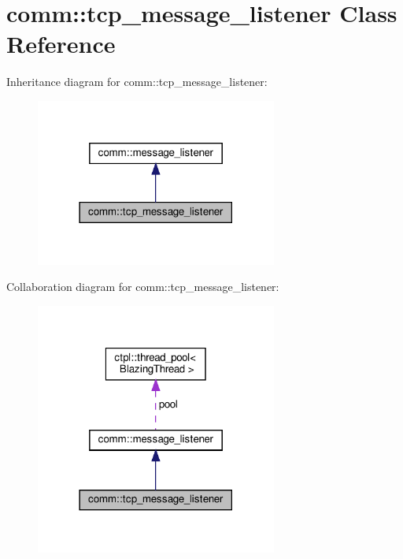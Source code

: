 \hypertarget{classcomm_1_1tcp__message__listener}{}\section{comm\+:\+:tcp\+\_\+message\+\_\+listener Class Reference}
\label{classcomm_1_1tcp__message__listener}


Inheritance diagram for comm\+:\+:tcp\+\_\+message\+\_\+listener\+:\nopagebreak
\begin{figure}[H]
\begin{center}
\leavevmode
\includegraphics[width=225pt]{classcomm_1_1tcp__message__listener__inherit__graph}
\end{center}
\end{figure}


Collaboration diagram for comm\+:\+:tcp\+\_\+message\+\_\+listener\+:\nopagebreak
\begin{figure}[H]
\begin{center}
\leavevmode
\includegraphics[width=225pt]{classcomm_1_1tcp__message__listener__coll__graph}
\end{center}
\end{figure}
